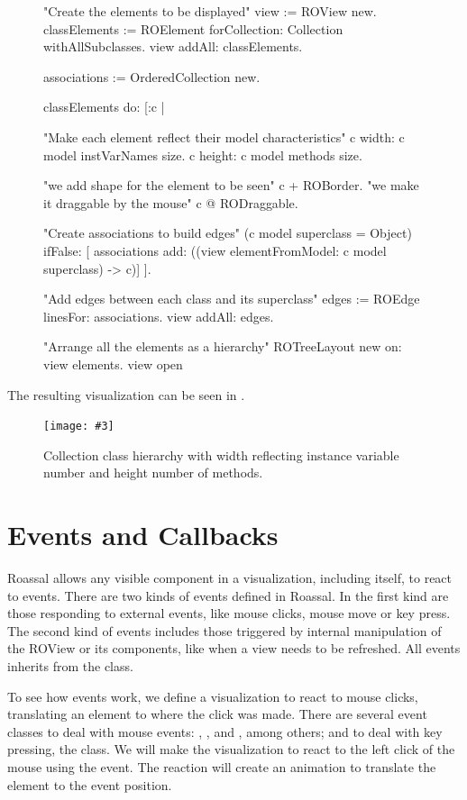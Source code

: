 \documentclass[a4paper,10pt,twoside]{book}
\newcommand{\fig}[4]{
		\begin{figure}[#1]
			\centering
			\texttt{[image: \#3]}
			\caption{\label{fig:#3}#4}
		\end{figure}}
\begin{document}
\begin{figure}[H]
\begin{code}{}

"Create the elements to be displayed"
view := ROView new.
classElements := ROElement forCollection: Collection withAllSubclasses.
view addAll: classElements.

associations := OrderedCollection new.

classElements do: [:c | 

	"Make each element reflect their model characteristics"
	c width: c model instVarNames size.
	c height: c model methods size.
	
	"we add shape for the element to be seen"
	c + ROBorder. 
	"we make it draggable by the mouse"
	c @ RODraggable.
	
	"Create associations to build edges"
	(c model superclass = Object)
		ifFalse: [ associations add: ((view elementFromModel: c model superclass) -> c)]	
	 ].
	 
"Add edges between each class and its superclass"
edges := ROEdge linesFor: associations.
view addAll: edges.

"Arrange all the elements as a hierarchy"
ROTreeLayout new on: view elements.
view open
\end{code}
\end{figure}

The resulting visualization can be seen in .

\fig{H}{0.4}{collectionHierarchy}{Collection class hierarchy with width reflecting instance variable number and height number of methods.}


\section{Events and Callbacks}

Roassal allows any visible component in a visualization, including itself, to react to events. There are two kinds of events defined in Roassal. In the first kind are those responding to external events, like mouse clicks, mouse move or key press. The second kind of events includes those triggered by internal manipulation of the ROView or its components, like when a view needs to be refreshed. All events inherits from the  class.

To see how events work, we define a visualization to react to mouse clicks, translating an element to where the click was made. 
There are several event classes to deal with mouse events: , ,  and , among others; and to deal with key pressing, the  class.
We will make the visualization to react to the left click of the mouse using the  event. The reaction will create an animation to translate the element to the event position.
\end{document}
